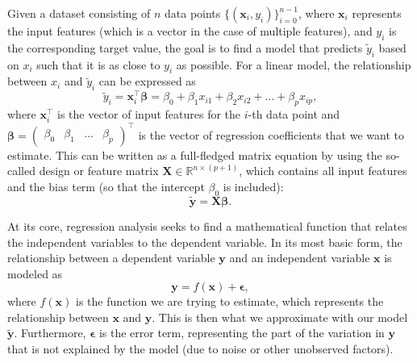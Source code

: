 \documentclass[aps,pra,english,notitlepage,reprint,nofootinbib]{revtex4-1}  %
\begin{document}
Given a dataset consisting of $n$ data points $\{(\mathbf{x}_i, y_i)\}_{i=0}^{n-1}$, where $\mathbf{x}_i$ represents the input features (which is a vector in the case of multiple features), and $y_i$ is the corresponding target value, the goal is to find a model that predicts $\tilde{y}_i$ based on $x_i$ such that it is as close to $y_i$ as possible. For a linear model, the relationship between $x_i$ and $\tilde{y}_i$ can be expressed as
\begin{equation}
\tilde{y}_i = \mathbf{x}_i^\top \boldsymbol{\beta} = \beta_0 + \beta_1 x_{i1} + \beta_2 x_{i2} + \dots + \beta_p x_{ip},
\end{equation}
where $\mathbf{x}_i^\top$ is the vector of input features for the $i$-th data point and $\boldsymbol{\beta} = \begin{pmatrix}\beta_0& \beta_1& \dots & \beta_p\end{pmatrix}^\top$ is the vector of regression coefficients that we want to estimate. This can be written as a full-fledged matrix equation by using the so-called design or feature matrix $\mathbf{X} \in \mathbb{R}^{n \times (p+1)}$, which contains all input features and the bias term (so that the intercept $\beta_0$ is included):
\begin{equation}
  \mathbf{\tilde{y}}=\mathbf{X}\boldsymbol{\beta}.
\end{equation}

At its core, regression analysis seeks to find a mathematical function that relates the independent variables to the dependent variable. In its most basic form, the relationship between a dependent variable $\mathbf{y}$ and an independent variable $\mathbf{x}$ is modeled as
\begin{equation}
  \mathbf{y} = f(\mathbf{x}) + \boldsymbol{\epsilon},
\end{equation}
where $f(\mathbf{x})$ is the function we are trying to estimate, which represents the relationship between $\mathbf{x}$ and $\mathbf{y}$. This is then what we approximate with our model $\mathbf{\tilde{y}}$. Furthermore, $\boldsymbol{\epsilon}$ is the error term, representing the part of the variation in $\mathbf{y}$ that is not explained by the model (due to noise or other unobserved factors). 
\end{document}
